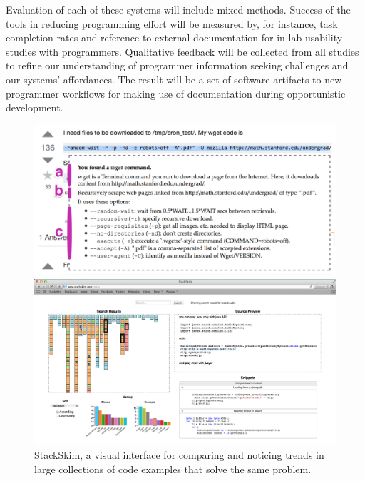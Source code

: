 \documentclass[12pt]{memoir}
\begin{document}
Evaluation of each of these systems will include mixed methods.
Success of the tools in reducing programming effort will be measured by, for instance, task completion rates and reference to external documentation for in-lab usability studies with programmers.
Qualitative feedback will be collected from all studies to refine our understanding of programmer information seeking challenges and our systems' affordances.
The result will be a set of software artifacts to new programmer workflows for making use of documentation during opportunistic development.

\begin{figure}%
  \centering
  \parbox{.45\textwidth}{%
    \includegraphics[width=\linewidth]{figures/tutorons_microexplanation}
    \caption{%
      A micro-explanation for a command line generated by a Tutoron with multiple levels of detail 
      (definition, high-level intent, arguments)
    }\label{fig:tutorons_microexplanation}
  }%
  \qquad
  \parbox{.45\textwidth}{%
    \includegraphics[width=\linewidth]{figures/stackskim_ui}
    \caption{%
      StackSkim, a visual interface for comparing and noticing trends in large collections of code examples that solve the same problem.
    }\label{fig:stackskim_ui}
  }
\end{figure}
\fi
\end{document}
